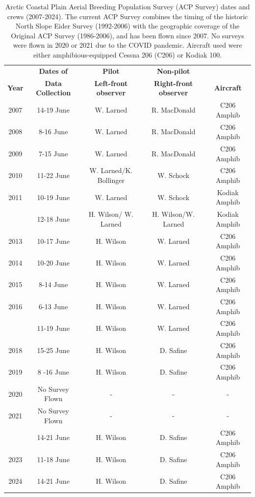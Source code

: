 \documentclass[
]{article}
\begin{document}
\begin{longtable}[t]{ccccc}

\caption{\label{tbl-crew}Arctic Coastal Plain Aerial Breeding Population
Survey (ACP Survey) dates and crews (2007-2024). The current ACP Survey
combines the timing of the historic North Slope Eider Survey (1992-2006)
with the geographic coverage of the Original ACP Survey (1986-2006), and
has been flown since 2007. No surveys were flown in 2020 or 2021 due to
the COVID pandemic. Aircraft used were either amphibious-equipped Cessna
206 (C206) or Kodiak 100.}

\tabularnewline

\\
\toprule
\multicolumn{1}{c}{\textbf{ }} & \multicolumn{1}{c}{\textbf{Dates of}} & \multicolumn{1}{c}{\textbf{Pilot}} & \multicolumn{1}{c}{\textbf{Non-pilot}} & \multicolumn{1}{c}{\textbf{ }} \\
\cmidrule(l{3pt}r{3pt}){2-2} \cmidrule(l{3pt}r{3pt}){3-3} \cmidrule(l{3pt}r{3pt}){4-4}
\textbf{Year} & \textbf{Data Collection} & \textbf{Left-front observer} & \textbf{Right-front observer} & \textbf{Aircraft}\\
\midrule
2007 & 14-19 June & W. Larned & R. MacDonald & C206 Amphib\\
2008 & 8-16 June & W. Larned & R. MacDonald & C206 Amphib\\
2009 & 7-15 June & W. Larned & R. MacDonald & C206 Amphib\\
2010 & 11-22 June & W. Larned/K. Bollinger & W. Schock & C206 Amphib\\
2011 & 10-19 June & W. Larned & W. Schock & Kodiak Amphib\\
\addlinespace
2012 & 12-18 June & H. Wilson/ W. Larned & H. Wilson/W. Larned & Kodiak Amphib\\
2013 & 10-17 June & H. Wilson & W. Larned & C206 Amphib\\
2014 & 10-20 June & H. Wilson & W. Larned & C206 Amphib\\
2015 & 8-14 June & H. Wilson & W. Larned & C206 Amphib\\
2016 & 6-13 June & H. Wilson & W. Larned & C206 Amphib\\
\addlinespace
2017 & 11-19 June & H. Wilson & W. Larned & C206 Amphib\\
2018 & 15-25 June & H. Wilson & D. Safine & C206 Amphib\\
2019 & 8 -16 June & H. Wilson & D. Safine & C206 Amphib\\
2020 & No Survey Flown & - & - & -\\
2021 & No Survey Flown & - & - & -\\
\addlinespace
2022 & 14-21 June & H. Wilson & D. Safine & C206 Amphib\\
2023 & 11-18 June & H. Wilson & D. Safine & C206 Amphib\\
2024 & 14-21 June & H. Wilson & D. Safine & C206 Amphib\\
\bottomrule

\end{longtable}
\end{document}

